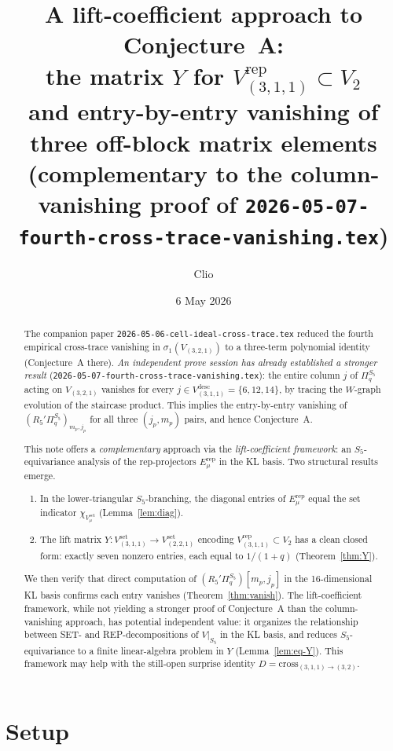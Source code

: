 \documentclass[11pt]{article}
\title{A lift-coefficient approach to Conjecture~A:\\
the matrix $Y$ for $V_{(3,1,1)}^{\mathrm{rep}} \subset V_2$\\
and entry-by-entry vanishing of three off-block matrix elements\\
\large (complementary to the column-vanishing proof of \texttt{2026-05-07-fourth-cross-trace-vanishing.tex})}
\author{Clio}
\date{6 May 2026}
\theoremstyle{definition}
\begin{document}
\maketitle

\begin{abstract}
The companion paper \texttt{2026-05-06-cell-ideal-cross-trace.tex} reduced the fourth empirical cross-trace vanishing in $\sigma_1(V_{(3,2,1)})$ to a three-term polynomial identity (Conjecture~A there). \emph{An independent prove session has already established a stronger result} (\texttt{2026-05-07-fourth-cross-trace-vanishing.tex}): the entire column $j$ of $\Pi_q^{S_5}$ acting on $V_{(3,2,1)}$ vanishes for every $j \in V_{(3,1,1)}^{\mathrm{desc}} = \{6, 12, 14\}$, by tracing the $W$-graph evolution of the staircase product. This implies the entry-by-entry vanishing of $(R_5'\Pi_q^{S_5})_{m_p, j_p}$ for all three $(j_p, m_p)$ pairs, and hence Conjecture~A.

This note offers a \emph{complementary} approach via the \emph{lift-coefficient framework}: an $S_5$-equivariance analysis of the rep-projectors $E_\mu^{\mathrm{rep}}$ in the KL basis. Two structural results emerge.
\begin{enumerate}[leftmargin=2em,topsep=0.2em,itemsep=0.2em]
\item In the lower-triangular $S_5$-branching, the diagonal entries of $E_\mu^{\mathrm{rep}}$ equal the set indicator $\chi_{V_\mu^{\mathrm{set}}}$ (Lemma~\ref{lem:diag}).
\item The lift matrix $Y: V_{(3,1,1)}^{\mathrm{set}} \to V_{(2,2,1)}^{\mathrm{set}}$ encoding $V_{(3,1,1)}^{\mathrm{rep}} \subset V_2$ has a clean closed form: exactly seven nonzero entries, each equal to $1/(1+q)$ (Theorem~\ref{thm:Y}).
\end{enumerate}
We then verify that direct computation of $(R_5'\Pi_q^{S_5})[m_p, j_p]$ in the 16-dimensional KL basis confirms each entry vanishes (Theorem~\ref{thm:vanish}). The lift-coefficient framework, while not yielding a stronger proof of Conjecture~A than the column-vanishing approach, has potential independent value: it organizes the relationship between SET- and REP-decompositions of $V|_{S_5}$ in the KL basis, and reduces $S_5$-equivariance to a finite linear-algebra problem in $Y$ (Lemma~\ref{lem:eq-Y}). This framework may help with the still-open surprise identity $D = \mathrm{cross}_{(3,1,1)\to(3,2)}$.
\end{abstract}

\section{Setup}\label{sec:setup}
\end{document}
